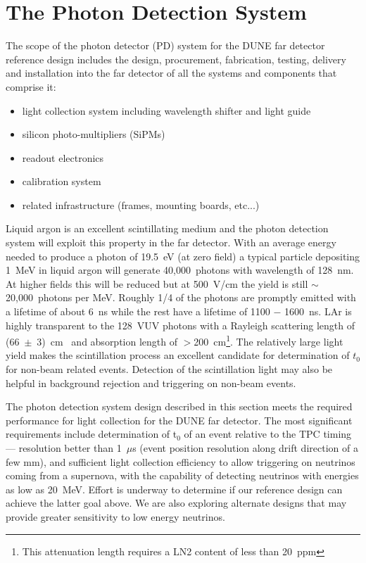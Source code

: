 \section{The Photon Detection System}
\label{sec:detectors-fd-ref-pd}

The scope of the photon detector (PD) system for the DUNE far detector
reference design includes the design, procurement, fabrication,
testing, delivery and installation into the far detector of all the
systems and components that comprise it:
\begin{itemize}
\item light collection system including wavelength shifter and light guide
\item silicon photo-multipliers (SiPMs)
\item readout electronics
\item calibration system
\item related infrastructure (frames, mounting boards, etc...)
\end{itemize}

Liquid argon is an excellent scintillating medium and the photon
detection system will exploit this property in the far detector.  With
an average energy needed to produce a photon of 19.5~eV (at zero
field) a typical particle depositing 1~MeV in liquid argon will
generate 40,000~photons with wavelength of 128~nm. At higher fields
this will be reduced but at 500~V/cm the yield is still
$\sim$20,000~photons per MeV. Roughly 1/4 of the photons are promptly
emitted with a lifetime of about 6~ns while the rest have a lifetime
of 1100 $-$ 1600~ns. LAr is highly transparent to the 128~VUV photons
with a Rayleigh scattering length of (66~$\pm$~3)~cm~\cite{Rayleigh}
and absorption length of $>$200~cm\footnote{This attenuation length
  requires a LN2 content of less than 20~ppm}. The relatively large light yield
makes the scintillation process an excellent candidate for
determination of $t_{0}$ for non-beam related events. Detection of the
scintillation light may also be helpful in background rejection and
triggering on non-beam events.

The photon detection system design described in this section meets the
required performance for light collection for the DUNE far
detector. The most significant requirements include determination of
t$_0$ of an event relative to the TPC timing --- resolution better than
1~$\mu$s (event position resolution along drift direction of a few
mm), and sufficient light collection efficiency to allow triggering on
neutrinos coming from a supernova, with the capability of detecting
neutrinos with energies as low as 20~MeV. Effort is underway to
determine if our reference design can achieve the latter goal
above. We are also exploring alternate designs that may provide
greater sensitivity to low energy neutrinos.

